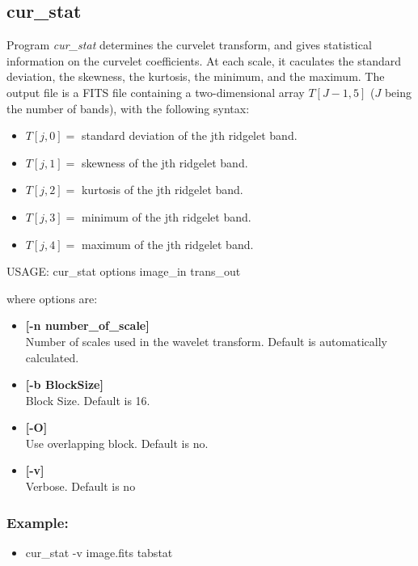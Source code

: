 \subsection{cur\_stat}
Program {\em cur\_stat} determines the  curvelet transform, and 
gives statistical information on the curvelet coefficients.
At each scale, it caculates the standard deviation, the skewness,
the kurtosis, the minimum, and the maximum. The output file is a 
FITS file containing a two-dimensional array $T[J-1,5]$ ($J$ being the
number of bands), with the following syntax:
\begin{itemize}
\baselineskip=0.4truecm
\itemsep=0.1truecm
\item $T[j,0] = $ standard deviation of the jth ridgelet band.
\item $T[j,1] = $ skewness of the jth ridgelet band.
\item $T[j,2] = $ kurtosis of the jth ridgelet band.
\item $T[j,3] = $ minimum of the jth ridgelet band.
\item $T[j,4] = $ maximum of the jth ridgelet band.
\end{itemize}
{\bf
\begin{center}
 USAGE: cur\_stat options image\_in trans\_out
\end{center}}
where options are:
\begin{itemize}
\baselineskip=0.4truecm
\item {\bf [-n number\_of\_scale]} \\
 Number of scales used in the wavelet transform.
 Default is automatically calculated.
\item {\bf [-b BlockSize]} \\
Block Size. Default is 16.
\item {\bf [-O]} \\
   Use overlapping block. Default is no.
\item {\bf [-v]} \\
Verbose. Default is no
\end{itemize}

\subsubsection*{Example:}
\begin{itemize}
\item cur\_stat -v  image.fits tabstat\\
\end{itemize}


